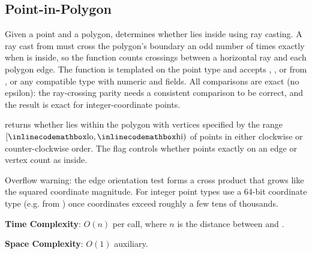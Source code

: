\subsection{Point-in-Polygon}
\label{sec:7.3.2}
Given a point  and a polygon, determines whether  lies inside using ray casting. A ray cast from  must cross the polygon's boundary an odd number of times exactly when  is inside, so the function counts crossings between a horizontal ray and each polygon edge. The function is templated on the point type  and accepts , , or  from , or any compatible type with numeric  and  fields. All comparisons are exact (no epsilon): the ray-crossing parity needs a consistent comparison to be correct, and the result is exact for integer-coordinate points.

\begin{compactitem}
  \item {} returns whether  lies within the polygon with vertices specified by the range $[{\inlinecodemath{lo}}, {\inlinecodemath{hi}})$ of points in either clockwise or counter-clockwise order. The  flag controls whether points exactly on an edge or vertex count as inside.
\end{compactitem}

Overflow warning: the edge orientation test forms a cross product that grows like the squared coordinate magnitude. For integer point types use a 64-bit coordinate type (e.g.  from ) once coordinates exceed roughly a few tens of thousands.

\textbf{Time Complexity}: $O(n)$ per call, where $n$ is the distance between  and .

\textbf{Space Complexity}: $O(1)$ auxiliary.

